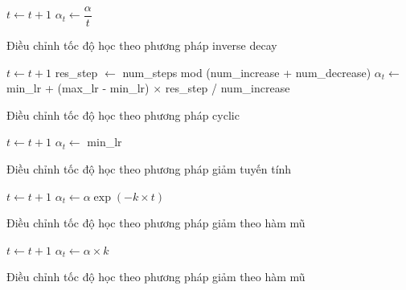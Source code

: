 \documentclass[14pt, a4paper]{article}
\theoremstyle{sltheorem}
\theoremstyle{soltheorem}
\begin{document}
\begin{algorithm}[h!]
    \DontPrintSemicolon
     {
        $t \gets t + 1$\;
        $\alpha_t \gets \dfrac{\alpha}{t}$\;
    }
    \caption{Điều chỉnh tốc độ học theo phương pháp inverse decay}
\end{algorithm}


\begin{algorithm}[h!]
    \DontPrintSemicolon
     {
        $t \gets t + 1$\;
        res\_step $\gets$ num\_steps mod (num\_increase + num\_decrease)\;
         {
            $\alpha_t \gets$  min\_lr + (max\_lr - min\_lr) $\times$ res\_step / num\_increase\;
        } 
    }
    \caption{Điều chỉnh tốc độ học theo phương pháp cyclic}
\end{algorithm}


\begin{algorithm}[h!]
    \DontPrintSemicolon
     {
        $t \gets t + 1$\;
         {
            $\alpha_t \gets$ min\_lr\;
        } 
    }
    \caption{Điều chỉnh tốc độ học theo phương pháp giảm tuyến tính}
\end{algorithm}

\begin{algorithm}[h!]
    \DontPrintSemicolon
     {
        $t \gets t + 1$\;
        $\alpha_t \gets \alpha \exp(-k \times t)$\;
    }
    \caption{Điều chỉnh tốc độ học theo phương pháp giảm theo hàm mũ}
\end{algorithm}

\begin{algorithm}[h!]
    \DontPrintSemicolon
     {
        $t \gets t + 1$\;
         {
            $\alpha_t \gets \alpha \times k$\;
        } 
    }
    \caption{Điều chỉnh tốc độ học theo phương pháp giảm theo hàm mũ}
\end{algorithm}
\end{document}
